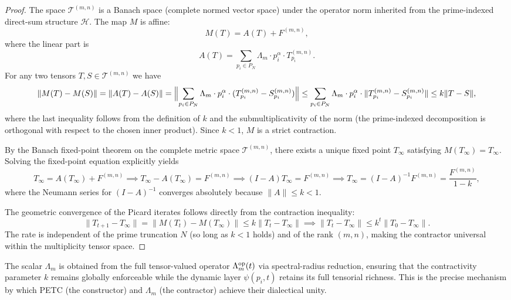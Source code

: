 \documentclass[11pt, a4paper]{article}
\begin{document}
\begin{proof}
The space \(\mathcal{T}^{(m,n)}\) is a Banach space (complete normed vector space) under the operator norm inherited from the prime-indexed direct-sum structure \(\mathcal{H}\). The map \(M\) is affine:
\[
M(T) = A(T) + F^{(m,n)},
\]
where the linear part is
\[
A(T) = \sum_{p_i \in P_N} \Lambda_m \cdot p_i^\alpha \cdot T_{p_i}^{(m,n)}.
\]
For any two tensors \(T, S \in \mathcal{T}^{(m,n)}\) we have
\[
\|M(T) - M(S)\| = \|A(T) - A(S)\| = \Bigl\| \sum_{p_i \in P_N} \Lambda_m \cdot p_i^\alpha \cdot (T_{p_i}^{(m,n)} - S_{p_i}^{(m,n)}) \Bigr\| \leq \sum_{p_i \in P_N} \Lambda_m \cdot p_i^\alpha \cdot \|T_{p_i}^{(m,n)} - S_{p_i}^{(m,n)}\| \leq k \|T - S\|,
\]
where the last inequality follows from the definition of \(k\) and the submultiplicativity of the norm (the prime-indexed decomposition is orthogonal with respect to the chosen inner product). Since \(k < 1\), \(M\) is a strict contraction.

By the Banach fixed-point theorem on the complete metric space \(\mathcal{T}^{(m,n)}\), there exists a unique fixed point \(T_\infty\) satisfying \(M(T_\infty) = T_\infty\). Solving the fixed-point equation explicitly yields
\[
T_\infty = A(T_\infty) + F^{(m,n)} \implies T_\infty - A(T_\infty) = F^{(m,n)} \implies (I - A)T_\infty = F^{(m,n)} \implies T_\infty = (I - A)^{-1} F^{(m,n)} = \frac{F^{(m,n)}}{1 - k},
\]
where the Neumann series for \((I - A)^{-1}\) converges absolutely because \(\|A\| \leq k < 1\).

The geometric convergence of the Picard iterates follows directly from the contraction inequality:
\[
\|T_{t+1} - T_\infty\| = \|M(T_t) - M(T_\infty)\| \leq k \|T_t - T_\infty\| \implies \|T_t - T_\infty\| \leq k^t \|T_0 - T_\infty\|.
\]
The rate is independent of the prime truncation \(N\) (so long as \(k < 1\) holds) and of the rank \((m,n)\), making the contractor universal within the multiplicity tensor space.
\end{proof}

\begin{remark}
The scalar \(\Lambda_m\) is obtained from the full tensor-valued operator \(\Lambda_m^{\rm op}(t)\) via spectral-radius reduction, ensuring that the contractivity parameter \(k\) remains globally enforceable while the dynamic layer \(\psi(p_i,t)\) retains its full tensorial richness. This is the precise mechanism by which PETC (the constructor) and \(\Lambda_m\) (the contractor) achieve their dialectical unity.
\end{remark}


\end{document}
